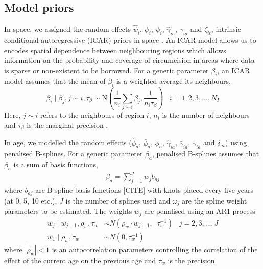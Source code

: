 \documentclass{article}
\begin{document}
\begin{appendix}

\subsection{Model priors}
\label{sec::priors}


In space, we assigned the random effects $\hat{\psi}_i$, $\bar{\psi}_i$, $\psi_i$, $\hat{\gamma}_{ia}$, $\gamma_{ia}$ and $\zeta_{it}$, intrinsic conditional autoregressive (ICAR) priors in space \cite{besag1995conditional}. An ICAR model allows us to encodes spatial dependence between neighbouring regions which allows information on the probability and coverage of circumcision in areas where data is sparse or non-existent to be borrowed. For a generic parameter $\beta_i$, an ICAR model assumes that the mean of $\beta_i$ is a weighted average its neighbours, 
\begin{equation*}
	\beta_i \;|\; \beta_{j}, j \sim i, \tau_{\beta} \sim \text{N}\left(\frac{1}{n_i} \sum_{j \sim i} \beta_j, \frac{1}{n_i\tau_{\beta}} \right) \;\;\; i = 1, 2, 3,\ldots, N_I
\end{equation*}
Here, $j \sim i$ refers to the neighbours of region $i$, $n_i$ is the number of neighbours and $\tau_{\beta}$ is the marginal precision \cite{rue2005gaussian}. 

In age, we modelled the random effects ($\hat{\phi}_a$, $\bar{\phi}_a$, $\phi_a$, $\hat{\gamma}_{ia}$, $\bar{\gamma}_{ia}$, $\gamma_{ia}$ and $\delta_{at}$) using penalised B-splines. For a generic parameter $\beta_a$, penalised B-splines assumes that $\beta_a$ is a sum of basis functions, 
\begin{align*} 
	\beta_a = \sum_{j = 1}^{J} w_{j}b_{aj}
\end{align*} 
where $b_{aj}$ are B-spline basis functions {\color{red}[CITE]} with knots placed every five years (at 0, 5, 10 etc.), $J$ is the number of splines used and $\omega_{j}$ are the spline weight parameters to be estimated. The weights $w_{j}$ are penalised using an AR1 process 
\begin{align*} 
  w_{j} \; | \; w_{j-1}, \rho_{w}, \tau_{w} &\sim N(\rho_{w} \cdot w_{j-1}, \;\; \tau^{-1}_{w}) \;\;\;  j = 2, 3,\ldots, J \\
  w_{1} \; | \; \rho_{w}, \tau_{w} &\sim N(0, \tau^{-1}_{w}) 
\end{align*}
where $|\rho_{w}| < 1$ is an autocorrelation parameters controlling the correlation of the effect of the current age on the previous age and $\tau_{w}$ is the precision.


\end{appendix}
\end{document}
